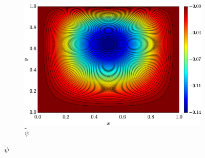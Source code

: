 \begin{figure}[H]
\begin{subfigure}[b]{.47\textwidth}
            \includegraphics[width=\textwidth]{figures/Case12/UCM/Solutions/Exact_Map_NormErr_2nd_Betann_0.1_Re_1_Wi_1_epsilon_0_xi_0_alphaG_0_Dt_1e-06_at_0.05_tipsim_1_MMS_12_Psi.eps}
            \caption{$\widetilde{\psi}$}
            \label{fig_solexapsistreamlineCase1}
        \end{subfigure}
        \fdadospesquisa
\end{figure}

